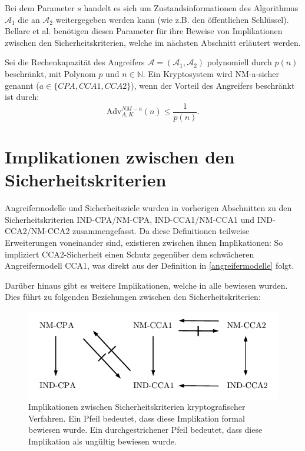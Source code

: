 Bei dem Parameter $s$ handelt es sich um Zustandsinformationen des Algorithmus $\mathcal{A}_1$ die an  $\mathcal{A}_2$ weitergegeben werden kann (wie z.B. den öffentlichen Schlüssel). Bellare et al. benötigen diesen Parameter für ihre Beweise von Implikationen zwischen den Sicherheitskriterien, welche im nächsten Abschnitt erläutert werden. 

Sei die Rechenkapazität des Angreifers $\mathcal{A} = (\mathcal{A}_1,\mathcal{A}_2)$ polynomiell durch $p(n)$ beschränkt, mit Polynom $p$ und $n\in\mathbb{N}$. Ein Kryptosystem wird NM-a-sicher genannt ($a\in\{CPA,CCA1,CCA2\}$), wenn der Vorteil des Angreifers beschränkt ist durch:
\begin{equation*}
	\text{Adv}^{NM-a}_{A,K}(n) \leq \frac{1}{p(n)}.
\end{equation*}



\section{Implikationen zwischen den Sicherheitskriterien} 
\label{impli}

Angreifermodelle und Sicherheitsziele wurden in vorherigen Abschnitten zu den Sicherheitskriterien IND-CPA/NM-CPA, IND-CCA1/NM-CCA1 und IND-CCA2/NM-CCA2 zusammengefasst. Da diese Definitionen teilweise Erweiterungen voneinander sind, existieren zwischen ihnen Implikationen: So impliziert CCA2-Sicherheit einen Schutz gegenüber dem schwächeren Angreifermodell CCA1, was direkt aus der Definition in \ref{angreifermodelle} folgt.

Darüber hinaus gibt es weitere Implikationen, welche in \cite{bellare1998relations} alle bewiesen wurden. Dies führt zu folgenden Beziehungen zwischen den Sicherheitskriterien:
\begin{figure}[h]
	\begin{center}
		\includegraphics{fig/Implikationen}
		\caption{Implikationen zwischen Sicherheitskriterien kryptografischer Verfahren. Ein Pfeil bedeutet, dass diese Implikation formal bewiesen wurde. Ein durchgestrichener Pfeil bedeutet, dass diese Implikation als ungültig bewiesen wurde.}
		\label{fig:plots}
	\end{center}
\end{figure}

